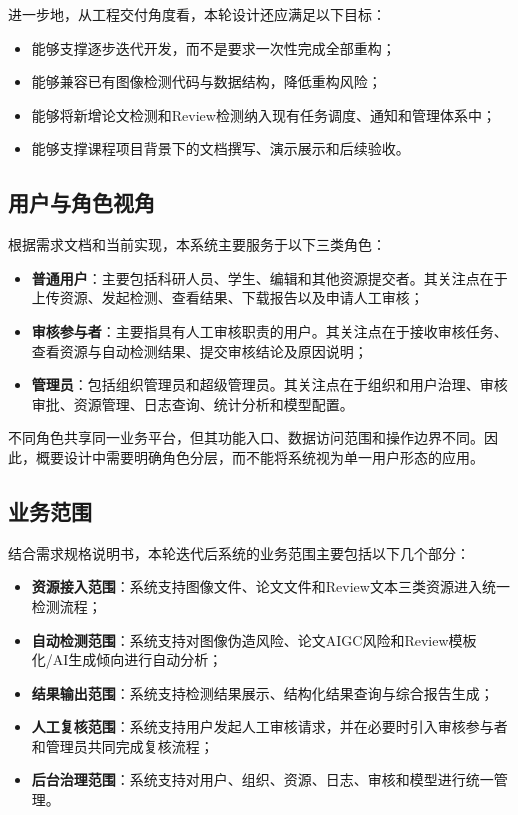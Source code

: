 进一步地，从工程交付角度看，本轮设计还应满足以下目标：
\begin{itemize}[leftmargin=2em]
    \item 能够支撑逐步迭代开发，而不是要求一次性完成全部重构；
    \item 能够兼容已有图像检测代码与数据结构，降低重构风险；
    \item 能够将新增论文检测和Review检测纳入现有任务调度、通知和管理体系中；
    \item 能够支撑课程项目背景下的文档撰写、演示展示和后续验收。
\end{itemize}

\subsection{用户与角色视角}
根据需求文档和当前实现，本系统主要服务于以下三类角色：
\begin{itemize}[leftmargin=2em]
    \item \textbf{普通用户}：主要包括科研人员、学生、编辑和其他资源提交者。其关注点在于上传资源、发起检测、查看结果、下载报告以及申请人工审核；
    \item \textbf{审核参与者}：主要指具有人工审核职责的用户。其关注点在于接收审核任务、查看资源与自动检测结果、提交审核结论及原因说明；
    \item \textbf{管理员}：包括组织管理员和超级管理员。其关注点在于组织和用户治理、审核审批、资源管理、日志查询、统计分析和模型配置。
\end{itemize}

不同角色共享同一业务平台，但其功能入口、数据访问范围和操作边界不同。因此，概要设计中需要明确角色分层，而不能将系统视为单一用户形态的应用。

\subsection{业务范围}
结合需求规格说明书，本轮迭代后系统的业务范围主要包括以下几个部分：
\begin{itemize}[leftmargin=2em]
    \item \textbf{资源接入范围}：系统支持图像文件、论文文件和Review文本三类资源进入统一检测流程；
    \item \textbf{自动检测范围}：系统支持对图像伪造风险、论文AIGC风险和Review模板化/AI生成倾向进行自动分析；
    \item \textbf{结果输出范围}：系统支持检测结果展示、结构化结果查询与综合报告生成；
    \item \textbf{人工复核范围}：系统支持用户发起人工审核请求，并在必要时引入审核参与者和管理员共同完成复核流程；
    \item \textbf{后台治理范围}：系统支持对用户、组织、资源、日志、审核和模型进行统一管理。
\end{itemize}

